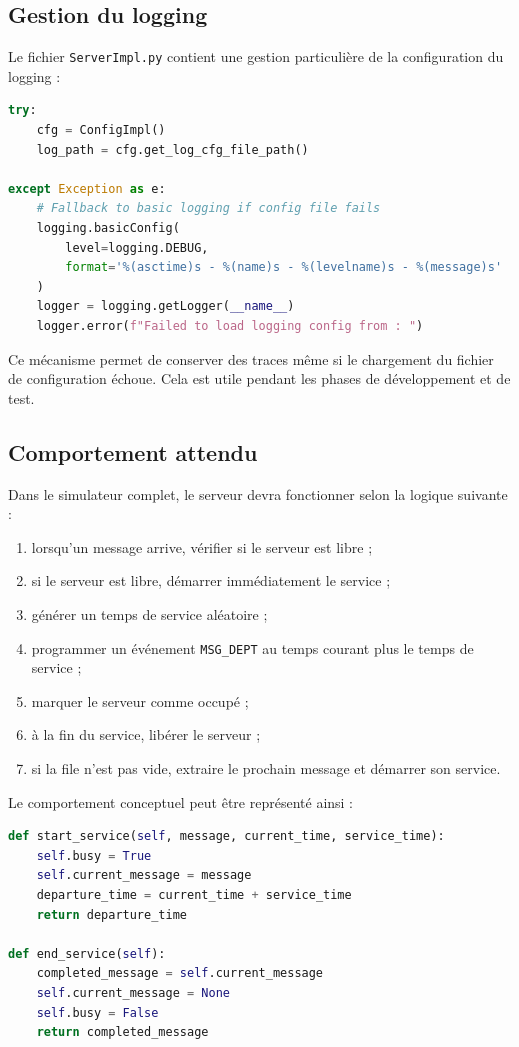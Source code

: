 \documentclass{article}
\begin{document}
\subsection{Gestion du logging}

Le fichier \texttt{ServerImpl.py} contient une gestion particulière de la configuration du logging :

\begin{lstlisting}[language=Python, caption=Principe de chargement de configuration dans ServerImpl.py]
try:
    cfg = ConfigImpl()
    log_path = cfg.get_log_cfg_file_path()

except Exception as e:
    # Fallback to basic logging if config file fails
    logging.basicConfig(
        level=logging.DEBUG,
        format='%(asctime)s - %(name)s - %(levelname)s - %(message)s'
    )
    logger = logging.getLogger(__name__)
    logger.error(f"Failed to load logging config from : ")
\end{lstlisting}

Ce mécanisme permet de conserver des traces même si le chargement du fichier de configuration échoue. Cela est utile pendant les phases de développement et de test.

\subsection{Comportement attendu}

Dans le simulateur complet, le serveur devra fonctionner selon la logique suivante :
\begin{enumerate}[leftmargin=*]
    \item lorsqu’un message arrive, vérifier si le serveur est libre ;
    \item si le serveur est libre, démarrer immédiatement le service ;
    \item générer un temps de service aléatoire ;
    \item programmer un événement \texttt{MSG\_DEPT} au temps courant plus le temps de service ;
    \item marquer le serveur comme occupé ;
    \item à la fin du service, libérer le serveur ;
    \item si la file n’est pas vide, extraire le prochain message et démarrer son service.
\end{enumerate}

Le comportement conceptuel peut être représenté ainsi :

\begin{lstlisting}[language=Python, caption=Principe conceptuel de traitement par un serveur]
def start_service(self, message, current_time, service_time):
    self.busy = True
    self.current_message = message
    departure_time = current_time + service_time
    return departure_time

def end_service(self):
    completed_message = self.current_message
    self.current_message = None
    self.busy = False
    return completed_message
\end{lstlisting}
\end{document}
